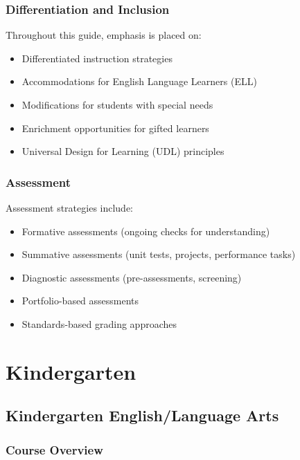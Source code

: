 \documentclass[11pt,letterpaper]{report}
\begin{document}
\section*{Differentiation and Inclusion}

Throughout this guide, emphasis is placed on:

\begin{itemize}
    \item Differentiated instruction strategies
    \item Accommodations for English Language Learners (ELL)
    \item Modifications for students with special needs
    \item Enrichment opportunities for gifted learners
    \item Universal Design for Learning (UDL) principles
\end{itemize}

\section*{Assessment}

Assessment strategies include:

\begin{itemize}
    \item Formative assessments (ongoing checks for understanding)
    \item Summative assessments (unit tests, projects, performance tasks)
    \item Diagnostic assessments (pre-assessments, screening)
    \item Portfolio-based assessments
    \item Standards-based grading approaches
\end{itemize}

\clearpage

\part{Kindergarten}

\chapter{Kindergarten English/Language Arts}

\section{Course Overview}
\end{document}
